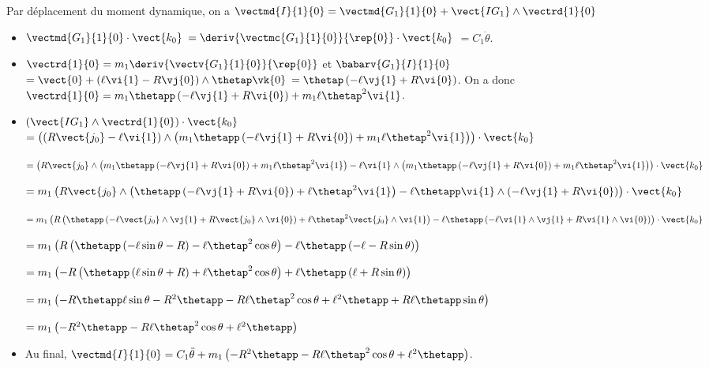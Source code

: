 Par déplacement du moment dynamique, on a 
$\vectmd{I}{1}{0} = \vectmd{G_1}{1}{0} + \vect{IG_1}\wedge \vectrd{1}{0}$
\begin{itemize}
\item $\vectmd{G_1}{1}{0}\cdot \vect{k_0} $ $= \deriv{\vectmc{G_1}{1}{0}}{\rep{0}} \cdot \vect{k_0} $ $=C_1 \ddot{\theta}$.
\item $\vectrd{1}{0} = m_1\deriv{\vectv{G_1}{1}{0}}{\rep{0}}$ et  
$\babarv{G_1}{I}{1}{0} $ $=\vect{0}+\left(\ell\vi{1}-R\vj{0} \right)\wedge\thetap \vk{0}$
$=\thetap\left(-\ell\vj{1}+R\vi{0} \right)$. 
On a donc $\vectrd{1}{0} = m_1\thetapp\left(-\ell\vj{1}+R\vi{0} \right)+m_1\ell\thetap^2\vi{1}$.
\item $ \left(\vect{IG_1}\wedge \vectrd{1}{0}\right)  \cdot \vect{k_0}$ 
$ = \left(\left(R\vect{j_0}-\ell\vi{1}\right)\wedge\left( m_1\thetapp\left(-\ell\vj{1}+R\vi{0} \right)+m_1\ell\thetap^2\vi{1}\right)\right)\cdot \vect{k_0}$

$ = \left(R\vect{j_0}\wedge\left( m_1\thetapp\left(-\ell\vj{1}+R\vi{0} \right)+m_1\ell\thetap^2\vi{1}\right)
-\ell\vi{1}\wedge\left( m_1\thetapp\left(-\ell\vj{1}+R\vi{0} \right)+m_1\ell\thetap^2\vi{1}\right)\right)\cdot \vect{k_0}$

$ = m_1\left(R\vect{j_0}\wedge\left( \thetapp\left(-\ell\vj{1}+R\vi{0} \right)+\ell\thetap^2\vi{1}\right)
-\ell \thetapp\vi{1}\wedge\left(-\ell\vj{1}+R\vi{0} \right)\right)\cdot \vect{k_0}$

$ = m_1\left(R\left( \thetapp\left(-\ell\vect{j_0}\wedge\vj{1}+R\vect{j_0}\wedge\vi{0} \right)+\ell\thetap^2\vect{j_0}\wedge\vi{1}\right)
-\ell \thetapp\left(-\ell\vi{1}\wedge\vj{1}+R\vi{1}\wedge\vi{0} \right)\right)\cdot \vect{k_0}$

$ = m_1\left(R\left( \thetapp\left(-\ell\sin\theta-R \right)-\ell\thetap^2\cos\theta\right)
-\ell \thetapp\left(-\ell-R\sin\theta \right)\right)$

$ = m_1\left(-R\left( \thetapp\left(\ell\sin\theta+R \right)+\ell\thetap^2\cos\theta\right)
+\ell \thetapp\left(\ell+R\sin\theta \right)\right)$

$ = m_1\left( -R\thetapp\ell\sin\theta-R^2\thetapp  -R\ell\thetap^2\cos\theta
+\ell^2 \thetapp+R\ell \thetapp\sin\theta \right)$

$ = m_1\left(-R^2\thetapp  -R\ell\thetap^2\cos\theta +\ell^2 \thetapp\right)$

\item Au final, $ \vectmd{I}{1}{0} =C_1 \ddot{\theta} + m_1\left(-R^2\thetapp  -R\ell\thetap^2\cos\theta +\ell^2 \thetapp\right)$.
\end{itemize}



